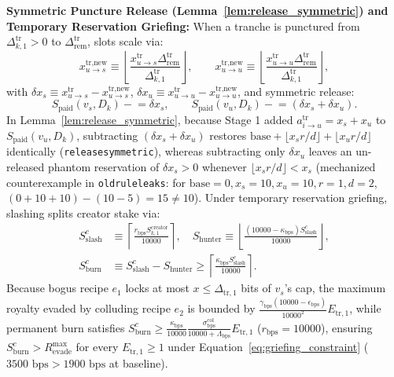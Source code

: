 \documentclass[runningheads,a4paper]{llncs}
\renewcommand{\_}{\textunderscore\allowbreak}
\begin{document}
\textbf{Symmetric Puncture Release (Lemma~\ref{lem:release_symmetric}) and Temporary Reservation Griefing:} When a tranche is punctured from $\Delta_{k,1}^{\text{tr}} > 0$ to $\Delta_{\text{rem}}^{\text{tr}}$, slots scale via:
\begin{equation}
\label{eq:puncture_slot_scale}
x_{u \to s}^{\text{tr,new}} \equiv \left\lfloor \frac{x_{u \to s}^{\text{tr}} \Delta_{\text{rem}}^{\text{tr}}}{\Delta_{k,1}^{\text{tr}}} \right\rfloor, \qquad
x_{u \to u}^{\text{tr,new}} \equiv \left\lfloor \frac{x_{u \to u}^{\text{tr}} \Delta_{\text{rem}}^{\text{tr}}}{\Delta_{k,1}^{\text{tr}}} \right\rfloor,
\end{equation}
with $\delta x_s \equiv x_{u \to s}^{\text{tr}} - x_{u \to s}^{\text{tr,new}}$, $\delta x_u \equiv x_{u \to u}^{\text{tr}} - x_{u \to u}^{\text{tr,new}}$, and symmetric release:
\begin{equation}
\label{eq:symmetric_release}
S_{\text{paid}}(v_s, D_k) \mathrel{-}= \delta x_s, \qquad
S_{\text{paid}}(v_u, D_k) \mathrel{-}= (\delta x_s + \delta x_u).
\end{equation}
In Lemma~\ref{lem:release_symmetric}, because Stage 1 added $a_{i \to u}^{\text{tr}} = x_s + x_u$ to $S_{\text{paid}}(v_u,\allowbreak D_k)$, subtracting $(\delta x_s + \delta x_u)$ restores $\text{base} + \lfloor x_s r / d \rfloor + \lfloor x_u r / d \rfloor$ identically (\texttt{release\_symmetric}), whereas subtracting only $\delta x_u$ leaves an un-released phantom reservation of $\delta x_s > 0$ whenever $\lfloor x_s r / d \rfloor < x_s$ (mechanized counterexample in \texttt{old\_rule\_leaks}: for $\text{base}=0,\allowbreak x_s=10,\allowbreak x_u=10,\allowbreak r=1,\allowbreak d=2$, $(0+10+10)-(10-5) = 15 \neq 10$). Under temporary reservation griefing, slashing splits creator stake via:
\begin{equation}
\label{eq:slash_split}
\begin{aligned}
S_{\text{slash}}^c &\equiv \left\lceil \frac{r_{\text{bps}} S_{k,1}^{\text{creator}}}{10000} \right\rceil, \quad
S_{\text{hunter}} \equiv \left\lfloor \frac{(10000 - \kappa_{\text{bps}}) S_{\text{slash}}^c}{10000} \right\rfloor, \\
S_{\text{burn}}^c &\equiv S_{\text{slash}}^c - S_{\text{hunter}} \ge \left\lceil \frac{\kappa_{\text{bps}} S_{\text{slash}}^c}{10000} \right\rceil.
\end{aligned}
\end{equation}
Because bogus recipe $e_1$ locks at most $x \le \Delta_{\text{tr},1}$ bits of $v_s$'s cap, the maximum royalty evaded by colluding recipe $e_2$ is bounded by $\frac{\gamma_{\text{bps}}(10000 - \epsilon_{\text{bps}})}{10000^2} E_{\text{tr},1}$, while permanent burn satisfies $S_{\text{burn}}^c \ge \frac{\kappa_{\text{bps}}}{10000} \frac{\sigma_{\text{bps}}^{\text{col}}}{10000 + \Lambda_{\text{bps}}} E_{\text{tr},1}$ ($r_{\text{bps}}=10000$), ensuring $S_{\text{burn}}^c > R_{\text{evade}}^{\max}$ for every $E_{\text{tr},1} \ge 1$ under Equation~\eqref{eq:griefing_constraint} ($3500\text{ bps} > 1900\text{ bps}$ at baseline).
\end{document}
